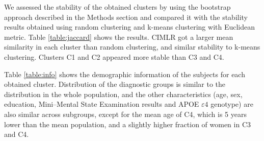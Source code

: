 We assessed the stability of the obtained clusters by using the bootstrap approach described in the Methods section and compared it with the stability results obtained using random clustering and k-means clustering with Euclidean metric. Table \ref{table:jaccard} shows the results. CIMLR got a larger mean similarity in each cluster than random clustering, and similar stability to k-means clustering. Clusters C1 and C2 appeared more stable than C3 and C4. \\

\begin{table}[!htbp]
\centering
{}
\caption[Stability tests.]{Stability tests for the clustering, compared to random clustering and k-means clustering using Euclidean distance. Reported result is mean similarity.}
\label{table:jaccard}
\end{table}

Table \ref{table:info} shows the demographic information of the subjects for each obtained cluster. Distribution of the diagnostic groups is similar to the distribution in the whole population, and the other characteristics (age, sex, education, Mini–Mental State Examination results and APOE $\varepsilon4$ genotype) are also similar across subgroups, except for the mean age of C4, which is 5 years lower than the mean population, and a slightly higher fraction of women in C3 and C4. \\


